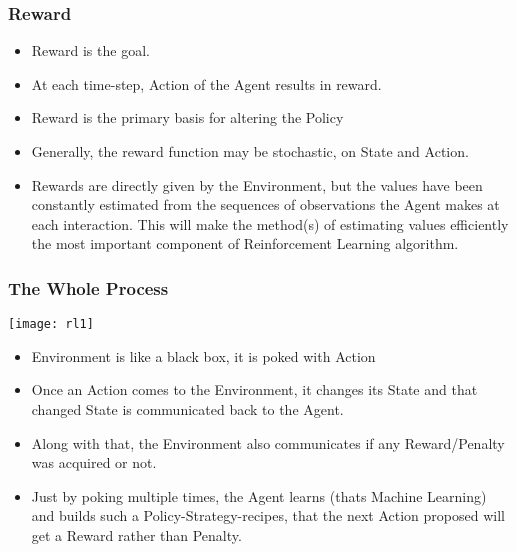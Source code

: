 \begin{frame}[fragile]\frametitle{Reward}

\begin{itemize}
\item Reward is the goal.
\item At each time-step, Action of the Agent results in reward.
\item Reward is the primary basis for altering the Policy
\item Generally, the reward function may be stochastic, on State and Action.
\item Rewards are directly given by the Environment, but the values have been constantly estimated from the sequences of observations the Agent makes at each interaction. This will make the method(s) of estimating values efficiently the most important component of Reinforcement Learning algorithm.
\end{itemize}

\end{frame}






\begin{frame}[fragile]\frametitle{The Whole Process}

\begin{center}
\texttt{[image: rl1]}
\end{center}

\begin{itemize}
\item Environment is like a black box, it is poked with Action
\item Once an Action comes to the Environment, it changes its State and that changed State is communicated back to the Agent.
\item Along with that, the Environment also communicates if any Reward/Penalty was acquired or not.
\item Just by poking multiple times, the Agent learns (thats Machine Learning) and builds such a Policy-Strategy-recipes, that the next Action proposed will get a Reward rather than Penalty.
\end{itemize}
\end{frame}


